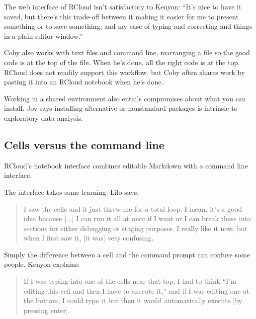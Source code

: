 The web interface of RCloud isn't satisfactory to Kenyon: ``It's nice to have
it saved, but there's this trade-off between it making it easier for me to
present something or to save something, and my ease of typing and
correcting and things in a plain editor window.''

Coby also works with text files and command line, rearranging a file so the
good code is at the top of the file. When he's done, all the right code is
at the top. RCloud does not readily support this workflow, but Coby
often shares work by pasting it into an RCloud notebook when he's done.


Working in a shared environment also entails compromises about what you can
install. Joy says installing alternative or nonstandard packages is
intrinsic to exploratory data analysis.

\subsection{Cells versus the command line}
RCloud's notebook interface combines editable Markdown with a command line
interface.

The interface takes some learning. Lilo says,
\begin{quote}
I saw the cells and it just threw me
for a total loop. I mean, it's a good idea because [...] I can run it all at
once if I want or I can break these into sections for either debugging or
staging purposes. I really like it now, but when I first saw it, [it was] very
confusing.
\end{quote}

Simply the difference between a cell and the command prompt can confuse some people.
Kenyon explains:
\begin{quote}
If I was typing into one of the cells near that top, I had to think ``I'm editing
this cell and then I have to execute it,'' and if I was editing one at the bottom,
I could type it but then it would automatically execute [by pressing enter].
\end{quote}

